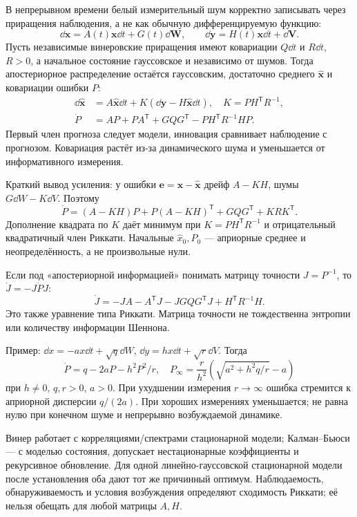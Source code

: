 
В непрерывном времени белый измерительный шум корректно записывать через приращения наблюдения, а не как обычную дифференцируемую функцию:
\begin{equation}
 \dd\bm x=A(t)\bm x\dd t+G(t)\dd\bm W,\qquad
 \dd\bm y=H(t)\bm x\dd t+\dd\bm V.
\end{equation}
Пусть независимые винеровские приращения имеют ковариации $Q\dd t$ и $R\dd t$, $R>0$, а начальное состояние гауссовское и независимо от шумов. Тогда апостериорное распределение остаётся гауссовским, достаточно среднего $\hat{\bm x}$ и ковариации ошибки $P$:
\begin{align}\label{eq:kalmanbucy}
 \dd\hat{\bm x}&=A\hat{\bm x}\dd t+K(\dd\bm y-H\hat{\bm x}\dd t),\quad K=PH^{\mathsf T}R^{-1},\\
 \dot P&=AP+PA^{\mathsf T}+GQG^{\mathsf T}-PH^{\mathsf T}R^{-1}HP.
\end{align}
Первый член прогноза следует модели, инновация сравнивает наблюдение с прогнозом. Ковариация растёт из-за динамического шума и уменьшается от информативного измерения.

Краткий вывод усиления: у ошибки $\bm e=\bm x-\hat{\bm x}$ дрейф $A-KH$, шумы $G\dd W-K\dd V$. Поэтому
\begin{equation}
 \dot P=(A-KH)P+P(A-KH)^{\mathsf T}+GQG^{\mathsf T}+KRK^{\mathsf T}.
\end{equation}
Дополнение квадрата по $K$ даёт минимум при $K=PH^{\mathsf T}R^{-1}$ и отрицательный квадратичный член Риккати. Начальные $\hat x_0,P_0$ — априорные среднее и неопределённость, а не произвольные нули.

Если под «апостериорной информацией» понимать матрицу точности $J=P^{-1}$, то $\dot J=-J\dot PJ$:
\begin{equation}
 \dot J=-JA-A^{\mathsf T}J-JGQG^{\mathsf T}J+H^{\mathsf T}R^{-1}H.
\end{equation}
Это также уравнение типа Риккати. Матрица точности не тождественна энтропии или количеству информации Шеннона.

Пример: $\dd x=-ax\dd t+\sqrt q\dd W$, $\dd y=hx\dd t+\sqrt r\dd V$. Тогда
\begin{equation}
 \dot P=q-2aP-h^2P^2/r,\quad
 P_\infty=\frac r{h^2}\left(\sqrt{a^2+h^2q/r}-a\right)
\end{equation}
при $h\ne0$, $q,r>0$, $a>0$. При ухудшении измерения $r\to\infty$ ошибка стремится к априорной дисперсии $q/(2a)$. При хороших измерениях уменьшается; не равна нулю при конечном шуме и непрерывно возбуждаемой динамике.

Винер работает с корреляциями/спектрами стационарной модели; Калман–Бьюси — с моделью состояния, допускает нестационарные коэффициенты и рекурсивное обновление. Для одной линейно-гауссовской стационарной модели после установления оба дают тот же причинный оптимум. Наблюдаемость, обнаруживаемость и условия возбуждения определяют сходимость Риккати; её нельзя обещать для любой матрицы $A,H$.

